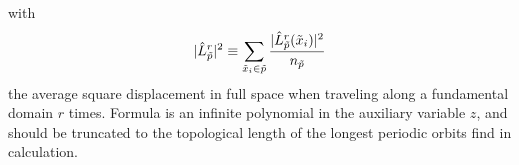with
\[
\vert\hat{L}_{{\tilde p}}^{r}\vert^2\equiv\sum_{\tilde x_i\in
  {\tilde p}}\frac{\vert\hat{L}_{{\tilde p}}^{r}(\tilde x_i)\vert^{2}}{{n_{{\tilde p}}}}
\]
the average square displacement in full space when traveling along a fundamental
domain $r$ times. Formula  is an infinite polynomial in
the auxiliary variable $z$, and should be truncated to the topological length of
the longest periodic orbits find in calculation.
